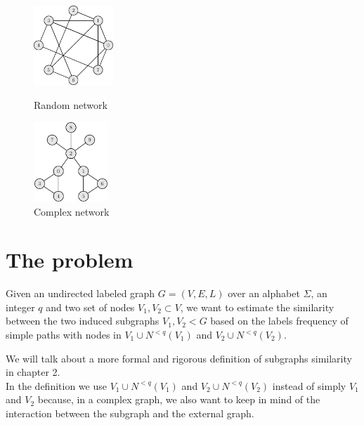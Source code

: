 \begin{figure}[h]
	\centering
	\begin{minipage}[t]{.45\textwidth}
		\centering
		\includegraphics[width=3cm,height=3cm]{figure/figure-1-3}
		\caption{Random network}
	\end{minipage}\hfill
	\begin{minipage}[t]{.45\textwidth}
		\centering
		\includegraphics[width=2.8cm,height=3cm]{figure/figure-1-4}
		\caption{Complex network}
	\end{minipage}
\end{figure}

\clearpage
\section{The problem}

\begin{problema}
Given an undirected labeled graph $G=(V,E,L)$ over an alphabet $\Sigma$, an integer $q$
and two set of nodes $V_{1}, V_{2} \subset V$, we want to estimate the similarity between the two induced subgraphs $V_{1}, V_{2} < G$ based on the labels frequency of simple paths with nodes in $V_{1} \cup N^{<q}(V_{1})$ and $V_{2} \cup N^{<q}(V_{2})$.
\end{problema}

We will talk about a more formal and rigorous definition of subgraphs similarity in chapter 2.\\

In the definition we use $V_{1} \cup N^{<q}(V_{1})$ and $V_{2} \cup N^{<q}(V_{2})$ instead of simply $V_{1}$ and $V_{2}$ because, in a complex graph, we also want to keep in mind of the interaction between the subgraph and the external graph.\\

